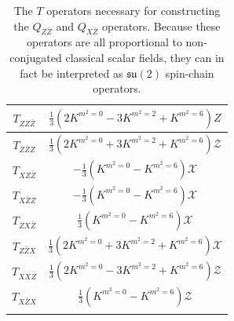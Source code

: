 %
%
\begin{table}
%
\begin{center}
%
\begingroup
\setlength{\tabcolsep}{7pt} %
\renewcommand{\arraystretch}{2.0} %
%
\begin{tabular}{ !{\vrule width 1.5pt}c!{\vrule width 1.5pt}c!{\vrule width 1.5pt} }
 	$T_{ZZ \bar{Z}}$ & $\frac{1}{3} \left( 2 K^{m^2 = 0} - 3 K^{m^2 = 2} + K^{m^2 = 6} \right) Z$ \\
	\hline 	
 	$T_{Z \bar{Z} Z}$ & $\frac{1}{3} \left( 2 K^{m^2 = 0} + 3 K^{m^2 = 2} + K^{m^2 = 6} \right) \mathcal{Z}$ \\
 	\hline
 	$T_{XZ \bar{Z}}$ & $-\frac{1}{3} \left( K^{m^2=0} - K^{m^2=6} \right) \mathcal{X}$ \\
	\hline 	
 	$T_{X \bar{Z} Z}$ & $-\frac{1}{3} \left( K^{m^2=0} - K^{m^2=6} \right) \mathcal{X}$ \\
 	\hline
 	$T_{ZX \bar{Z}}$ & $\frac{1}{3} \left( K^{m^2=0} - K^{m^2=6} \right) \mathcal{X}$ \\
	\hline 	
 	 $T_{Z \bar{Z} X}$ & $\frac{1}{3} \left( 2 K^{m^2 = 0} + 3 K^{m^2 = 2} + K^{m^2 = 6} \right) \mathcal{X}$ \\
 	\hline
 	$T_{XX \bar{Z}}$ & $\frac{1}{3} \left( 2 K^{m^2 = 0} - 3 K^{m^2 = 2} + K^{m^2 = 6} \right) \mathcal{Z}$ \\
	\hline 	
 	$T_{X \bar{Z} X}$ & $\frac{1}{3} \left( K^{m^2=0} - K^{m^2=6} \right) \mathcal{Z}$ \\
\end{tabular}
%
\endgroup
%
\end{center}
%
\caption[$T$ operators necessary for constructing $Q_{Z \bar{Z}}$ and $Q_{X \bar{Z}}$]{The $T$ operators necessary for constructing the $Q_{Z \bar{Z}}$ and $Q_{X \bar{Z}}$ operators. Because these operators are all proportional to non-conjugated classical scalar fields, they can in fact be interpreted as $\mathfrak{su}(2)$ spin-chain operators.}
%
\label{tab:T-table-3}
%
\end{table}
%
%
